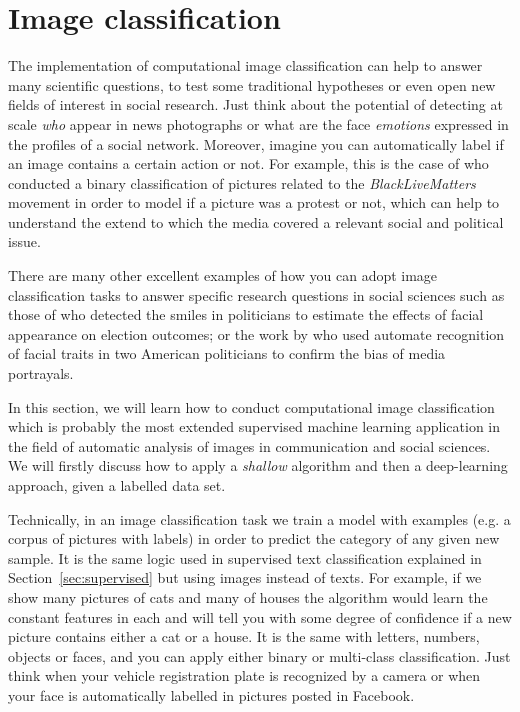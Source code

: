 \section{Image classification}
\label{sec:cnn}

The implementation of computational image classification can help to answer many scientific questions, to test some traditional hypotheses or even open new fields of interest in social research. Just think about the potential of detecting at scale \textit{who} appear in news photographs or what are the face \textit{emotions} expressed in the profiles of a social network. Moreover, imagine you can automatically label if an image contains a certain action or not. For example, this is the case of \citet{williams2020images} who conducted a binary classification of pictures related to the \textit{BlackLiveMatters} movement in order to model if a picture was a protest or not, which can help to understand the extend to which the media covered a relevant social and political issue.

There are many other excellent examples of how you can adopt image classification tasks to answer specific research questions in social sciences such as those of \citet{horiuchi2012should} who detected the smiles in politicians to estimate the effects of facial appearance on election outcomes; or the work by \citet{peng2018same} who used automate recognition of facial traits in two American politicians to confirm the bias of media portrayals.

In this section, we will learn how to conduct computational image classification which is probably the most extended supervised machine learning application in the field of automatic analysis of images in communication and social sciences. We will firstly discuss how to apply a \textit{shallow} algorithm and then a deep-learning approach, given a labelled data set. 	

Technically, in an image classification task we train a model with examples (e.g. a corpus of pictures with labels) in order to predict the category of any given new sample. It is the same logic used in supervised text classification  explained in Section~\ref{sec:supervised} but using images instead of texts. For example, if we show many pictures of cats and many of houses the algorithm would learn the constant features in each and will tell you with some degree of confidence if a new picture contains either a cat or a house. It is the same with letters, numbers, objects or faces, and you can apply either binary or multi-class classification. Just think when your vehicle registration plate is recognized by a camera or when your face is automatically labelled in pictures posted in Facebook.

